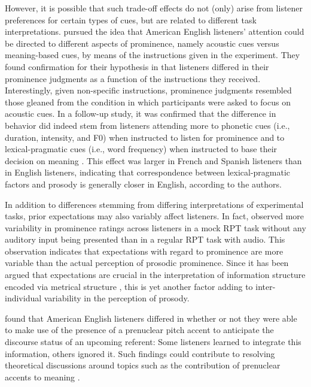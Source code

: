 However, it is possible that such trade-off effects do not (only) arise from listener preferences for certain types of cues, but are related to different task interpretations. \citet{coleListeningSoundListening2014} pursued the idea that American English listeners' attention could be directed to different aspects of prominence, namely acoustic cues versus meaning-based cues, by means of the instructions given in the experiment. They found confirmation for their hypothesis in that listeners differed in their prominence judgments as a function of the instructions they received. Interestingly, given non-specific instructions, prominence judgments resembled those gleaned from the condition in which participants were asked to focus on acoustic cues. In a follow-up study, it was confirmed that the difference in behavior did indeed stem from listeners attending more to phonetic cues (i.e., duration, intensity, and F0) when instructed to listen for prominence and to lexical-pragmatic cues (i.e., word frequency) when instructed to base their decision on meaning \citep{coleSoundStructureMeaning2019}. This effect was larger in French and Spanish listeners than in English listeners, indicating that correspondence between lexical-pragmatic factors and prosody is generally closer in English, according to the authors.

In addition to differences stemming from differing interpretations of experimental tasks, prior expectations may also variably affect listeners. In fact, \citet{moProsodyProductionPerception2010} observed more variability in prominence ratings across listeners in a mock RPT task without any auditory input being presented than in a regular RPT task with audio. This observation indicates that expectations with regard to prominence are more variable than the actual perception of prosodic prominence. Since it has been argued that expectations are crucial in the interpretation of information structure encoded via metrical structure \citep{calhounCentralityMetricalStructure2010}, this is yet another factor adding to inter-individual variability in the perception of prosody.

\citet{roettgerPositionalBiasesPredictive2021} found that American English listeners differed in whether or not they were able to make use of the presence of a prenuclear pitch accent to anticipate the discourse status of an upcoming referent: Some listeners learned to integrate this information, others ignored it. Such findings could contribute to resolving theoretical discussions around topics such as the contribution of prenuclear accents to meaning \citep{buringSemanticsIntonationInformation2007, baumannInfluenceInformativenessProsody2021, roessigInverseRelationPrenuclear2024}.

